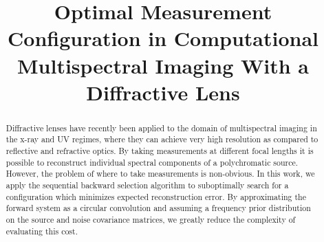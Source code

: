 \documentclass{article}
\title{Optimal Measurement Configuration in Computational \\ Multispectral Imaging With a Diffractive Lens}
\begin{document}
\maketitle

\begin{abstract}

Diffractive lenses have recently been applied to the domain of multispectral
imaging in the x-ray and UV regimes, where they can achieve very high resolution
as compared to reflective and refractive optics. By taking measurements at
different focal lengths it is possible to reconstruct individual spectral
components of a polychromatic source. However, the problem of where to take
measurements is non-obvious. In this work, we apply the sequential backward selection
algorithm to suboptimally search for a configuration which minimizes expected
reconstruction error. By approximating the forward system as a circular
convolution and assuming a frequency prior distribution on the source and noise
covariance matrices, we greatly reduce the complexity of evaluating this cost.

\end{abstract}
\end{document}
